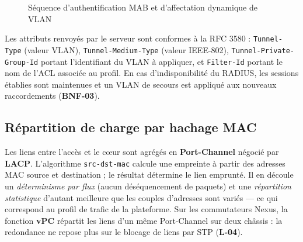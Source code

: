 \documentclass[11pt,a4paper]{article}
\newcommand{\ttb}[1]{\texttt{\small #1}}
\newcommand{\rid}[1]{\textcolor{primary}{\textbf{\small #1}}}
\begin{document}
\begin{figure}[H]
\centering
{}
\caption{Séquence d'authentification MAB et d'affectation dynamique de VLAN}
\end{figure}

Les attributs renvoyés par le serveur sont conformes à la RFC 3580 : \ttb{Tunnel-Type} (valeur VLAN), \ttb{Tunnel-Medium-Type} (valeur IEEE-802), \ttb{Tunnel-Private-Group-Id} portant l'identifiant du VLAN à appliquer, et \ttb{Filter-Id} portant le nom de l'ACL associée au profil. En cas d'indisponibilité du RADIUS, les sessions établies sont maintenues et un VLAN de secours est appliqué aux nouveaux raccordements (\rid{BNF-03}).

\subsection{Répartition de charge par hachage MAC}
Les liens entre l'accès et le c\oe ur sont agrégés en \textbf{Port-Channel} négocié par \textbf{LACP}. L'algorithme \ttb{src-dst-mac} calcule une empreinte à partir des adresses MAC source et destination ; le résultat détermine le lien emprunté. Il en découle un \emph{déterminisme par flux} (aucun déséquencement de paquets) et une \emph{répartition statistique} d'autant meilleure que les couples d'adresses sont variés --- ce qui correspond au profil de trafic de la plateforme. Sur les commutateurs Nexus, la fonction \textbf{vPC} répartit les liens d'un même Port-Channel sur deux châssis : la redondance ne repose plus sur le blocage de liens par STP (\rid{L-04}).
\end{document}
